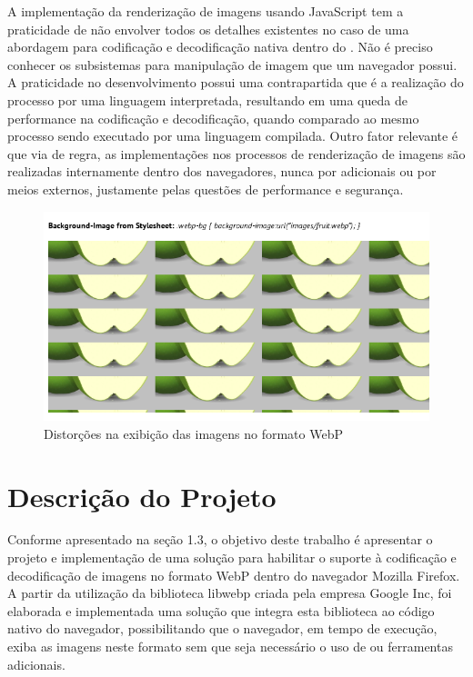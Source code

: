 \documentclass[espaco=simples,appendix=Name]{abnt}
\begin{document}
A implementação da renderização de imagens usando JavaScript tem a praticidade de não envolver todos os detalhes existentes no caso de uma abordagem para codificação e decodificação nativa dentro do . Não é preciso conhecer os subsistemas para manipulação de imagem que um navegador possui. A praticidade no desenvolvimento possui uma contrapartida que é a realização do
 processo por uma linguagem interpretada, resultando em uma queda de performance na codificação e decodificação, quando comparado ao mesmo processo sendo executado por uma linguagem compilada. Outro fator relevante é que via de regra, as implementações nos processos de renderização de imagens são realizadas internamente dentro dos navegadores, nunca por  adicionais ou por meios externos, justamente pelas questões de performance e segurança.

\begin{figure}[h]
  \centering
    \includegraphics[scale=0.4]{Erro_webpjs.png}
  \caption{Distorções na exibição das imagens no formato WebP}
\end{figure}

\chapter{Descrição do Projeto}

Conforme apresentado na seção 1.3, o objetivo deste trabalho é apresentar o projeto e implementação de uma solução para habilitar o suporte à codificação e decodificação de imagens no formato WebP dentro do navegador Mozilla Firefox. A partir da utilização da biblioteca libwebp criada pela empresa Google Inc, foi elaborada e implementada uma solução que integra esta biblioteca ao código nativo do navegador, possibilitando que o navegador, em tempo de execução, exiba as imagens neste formato sem que seja necessário o uso de  ou ferramentas adicionais.
\end{document}
